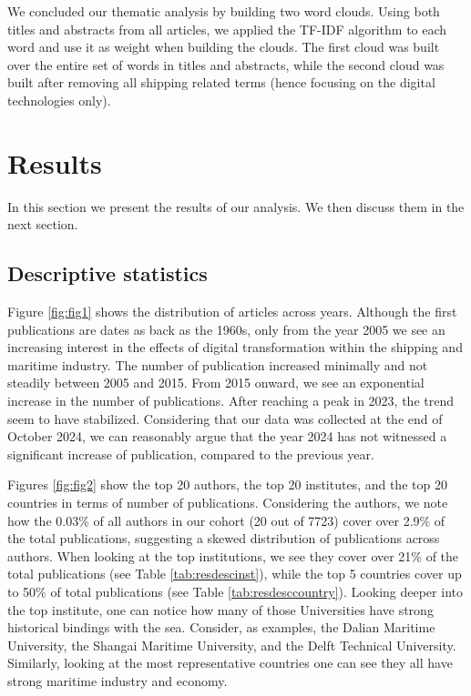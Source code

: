 \documentclass[jmse,review,submit,pdftex,moreauthors]{Definitions/mdpi}
\begin{document}
We concluded our thematic analysis by building two word clouds. Using both titles and abstracts from all articles, we applied the TF-IDF algorithm to each word and use it as weight when building the clouds. The first cloud was built over the entire set of words in titles and abstracts, while the second cloud was built after removing all shipping related terms (hence focusing on the digital technologies only).

\section{Results}

In this section we present the results of our analysis. We then discuss them in the next section.

\subsection{Descriptive statistics}
Figure \ref{fig:fig1} shows the distribution of articles across years. Although the first publications are dates as back as the 1960s, only from the year 2005 we see an increasing interest in the effects of digital transformation within the shipping and maritime industry. The number of publication increased minimally and not steadily between 2005 and 2015. From 2015 onward, we see an exponential increase in the number of publications. After reaching a peak in 2023, the trend seem to have stabilized. Considering that our data was collected at the end of October 2024, we can reasonably argue that the year 2024 has not witnessed a significant increase of publication, compared to the previous year.

Figures \ref{fig:fig2} show the top 20 authors, the top 20 institutes, and the top 20 countries in terms of number of publications. Considering the authors, we note how the 0.03\% of all authors in our cohort (20 out of 7723) cover over 2.9\% of the total publications, suggesting a skewed distribution of publications across authors. When looking at the top institutions, we see they cover over 21\% of the total publications (see Table \ref{tab:resdescinst}), while the top 5 countries cover up to 50\% of total publications (see Table \ref{tab:resdesccountry}). Looking deeper into the top institute, one can notice how many of those Universities have strong historical bindings with the sea. Consider, as examples, the Dalian Maritime University, the Shangai Maritime University, and the Delft Technical University. Similarly, looking at the most representative countries one can see they all have strong maritime industry and economy.
\end{document}
